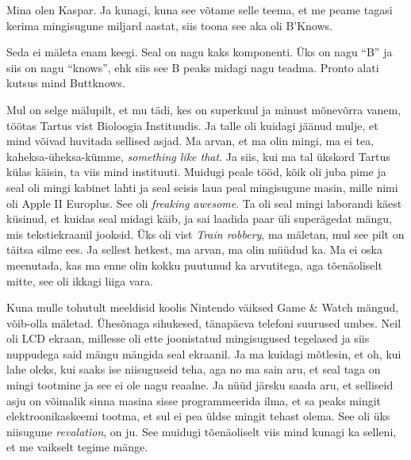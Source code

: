 

Mina olen Kaspar. Ja kunagi, kuna see võtame selle teema, et me peame tagasi kerima mingisugune miljard aastat, siis toona see aka oli B'Knows. 


Seda ei mäleta enam keegi. Seal on nagu kaks komponenti. Üks on nagu \enquote{B} ja siis on nagu \enquote{knows}, ehk siis see B peaks  midagi nagu teadma. Pronto alati kutsus mind Buttknows.


Mul on selge mälupilt, et mu tädi, kes on superkuul ja minust mõnevõrra vanem, töötas Tartus
vist Bioloogia Instituudis. Ja  talle oli kuidagi jäänud mulje, et mind võivad huvitada sellised asjad. Ma arvan, et ma olin mingi, ma ei tea, kaheksa-üheksa-kümme, \emph{something like that}. Ja siis, kui ma tal ükskord Tartus külas käisin, ta viis mind instituuti. Muidugi peale tööd, kõik oli juba pime ja  seal oli mingi kabinet lahti ja seal seisis laua peal mingisugune masin, mille nimi oli Apple II Europlus. See oli \emph{freaking awesome}. Ta oli seal mingi laborandi käest küsinud, et kuidas seal midagi käib, ja sai laadida paar üli superägedat mängu, mis tekstiekraanil jooksid. Üks oli vist \emph{Train robbery}, ma mäletan, mul see pilt on täitsa silme ees. Ja sellest hetkest, ma arvan, ma olin müüdud ka. Ma ei oska  meenutada, kas ma enne olin kokku puutunud ka arvutitega, aga tõenäoliselt mitte, see oli ikkagi liiga  vara. 

Kuna mulle tohutult meeldisid koolis Nintendo väiksed Game \& Watch mängud, võib-olla mäletad. Ühesõnaga sihukesed, tänapäeva telefoni suurused umbes. Neil oli LCD ekraan, millesse oli ette joonistatud mingisugused tegelased ja siis nuppudega said mängu mängida seal ekraanil. Ja  ma kuidagi mõtlesin, et oh, kui lahe oleks, kui saaks ise niisuguseid teha, aga no ma sain aru, et seal taga on mingi tootmine ja see ei ole nagu reaalne. Ja nüüd järsku saada aru, et selliseid asju on võimalik sinna masina sisse programmeerida ilma,  et sa peaks mingit elektroonikaskeemi tootma, et sul ei pea üldse mingit tehast olema. See oli üks niisugune \emph{revalation}, on ju. See muidugi  tõenäoliselt viis mind kunagi ka selleni, et me vaikselt tegime mänge. 

